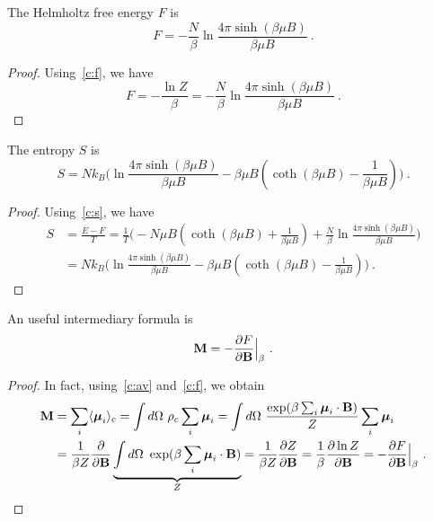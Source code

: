    The Helmholtz free energy $F$ is 
    \begin{equation*}
        F = - \frac{N}{\beta} \ln \frac{4 \pi \sinh (\beta \mu B)}{\beta \mu B} ~.
    \end{equation*}
    \begin{proof}
        Using~\eqref{c:f}, we have
        \begin{equation*}
            F = - \frac{\ln Z}{\beta} = - \frac{N}{\beta} \ln \frac{4 \pi \sinh (\beta \mu B)}{\beta \mu B} ~.
        \end{equation*}
    \end{proof}
    
    The entropy $S$ is 
    \begin{equation*}
        S = N k_B \Big ( \ln \frac{4 \pi \sinh (\beta \mu B)}{\beta \mu B}  - \beta \mu B (\coth (\beta \mu B) - \frac{1}{\beta \mu B} ) \Big ) ~.
    \end{equation*}
    \begin{proof}
        Using~\eqref{c:s}, we have
        \begin{equation*}
        \begin{aligned}
            S & = \frac{E - F}{T} = \frac{1}{T} \Big (- N \mu B (\coth (\beta \mu B) + \frac{1}{\beta \mu B} ) + \frac{N}{\beta} \ln \frac{4 \pi \sinh (\beta \mu B)}{\beta \mu B}  \Big ) \\ & = N k_B \Big ( \ln \frac{4 \pi \sinh (\beta \mu B)}{\beta \mu B}  - \beta \mu B (\coth (\beta \mu B) - \frac{1}{\beta \mu B} ) \Big )~. 
        \end{aligned}
        \end{equation*}
    \end{proof}

    An useful intermediary formula is 
    \begin{equation*}
        \mathbf M = - \frac{\partial F}{\partial\mathbf B} \Big \vert_{\beta} ~.
    \end{equation*}
    \begin{proof}
        In fact, using~\eqref{c:av} and~\eqref{c:f}, we obtain 
        \begin{equation*}
        \begin{aligned}
            \mathbf M & = \sum_i \langle\boldsymbol \mu_i\rangle_c = \int d\Omega ~ \rho_c \sum_i \boldsymbol \mu_i  = \int d\Omega ~ \frac{\exp(\beta \sum_i \boldsymbol \mu_i \cdot \mathbf B)}{Z} \sum_i \boldsymbol \mu_i \\ & = \frac{1}{\beta Z} \frac{\partial}{\partial\mathbf B} \underbrace{\int d\Omega ~ \exp(\beta \sum_i \boldsymbol \mu_i \cdot \mathbf B)}_Z = \frac{1}{\beta Z} \frac{\partial Z}{\partial\mathbf B} = \frac{1}{\beta} \frac{\partial\ln Z}{\partial\mathbf B} = - \frac{\partial F}{\partial\mathbf B} \Big \vert_{\beta} ~.
        \end{aligned}
        \end{equation*}
    \end{proof}

